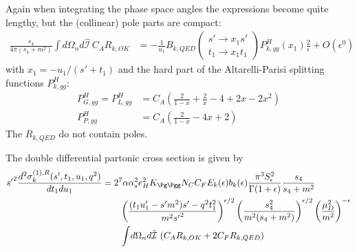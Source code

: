 Again when integrating the phase space angles the expressions become quite lengthy, but the (collinear) pole parts are compact:
\begin{align}
\frac{s_4}{4\pi(s_4+m^2)}\int\!d\Omega_n d\hat{\mathcal I}\,C_A R_{k,OK} &=-\frac 1 {u_1}B_{k,QED}\left(\!\begin{array}{l}s'\rightarrow x_1s'\\t_1\rightarrow x_1 t_1\end{array}\!\!\right) P^H_{k,gg}(x_1)\frac 2 \epsilon + O(\epsilon^0)
\end{align}
with $x_1 = -u_1/(s'+t_1)$ and the hard part of the Altarelli-Parisi splitting functions $P^H_{k,gg}$\cite{Altarelli:1977zs,Vogelsang:1995vh}:
\begin{align}
P^H_{G,gg} = P^H_{L,gg} &= C_A\left(\frac 2 {1-x} + \frac 2 x - 4 + 2x - 2x^2\right)\\
P^H_{P,gg} &= C_A\left(\frac 2 {1-x} - 4x + 2\right)
\end{align}
The $R_{k,QED}$ do not contain poles.

The double differential partonic cross section is given by
\begin{align}
{s'}^2\frac{d^2\sigma_{k}^{(1),R}(s',t_1,u_1,q^2)}{dt_1du_1} &= 2^7\alpha\alpha_s^2 e_H^2 K_{\Pg\Pgg}N_CC_F E_k(\epsilon) b_k(\epsilon)\frac{\pi^3 S_\epsilon^2}{\Gamma(1+\epsilon)} \frac{s_4}{s_4+m^2}  \nonumber\\
 &\hspace{20pt} \left(\frac{(t_1u_1'-s'm^2)s' - q^2t_1^2}{m^2{s'}^2}\right)^{\epsilon/2} \left(\frac{s_4^2}{m^2(s_4+m^2)}\right)^{\epsilon/2} \left(\frac{\mu_D^2}{m^2}\right)^{-\epsilon} \nonumber\\
 &\hspace{20pt} \int\!d\Omega_n d\hat{\mathcal I}\,\left(C_A R_{k,OK} + 2C_F R_{k,QED}\right)
\end{align}

